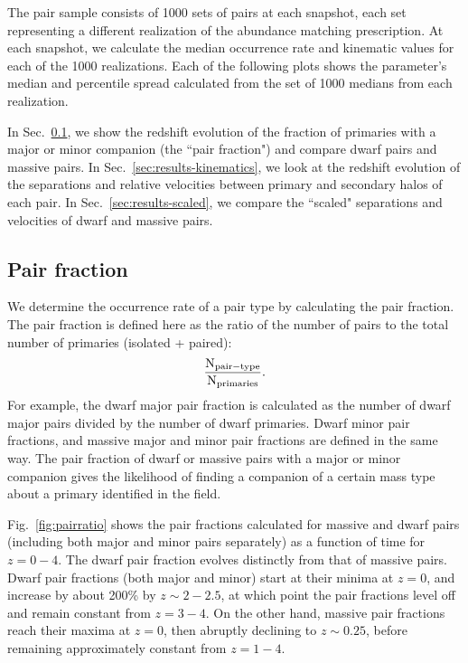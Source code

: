 \documentclass[twocolumn]{aastex631}
\begin{document}
The pair sample consists of 1000 sets of pairs at each snapshot, each set representing a different realization of the abundance matching prescription. 
At each snapshot, we calculate the median occurrence rate and kinematic values for each of the 1000 realizations. 
Each of the following plots shows the parameter's median and percentile spread calculated from the set of 1000 medians from each realization.

In Sec.~\ref{sec:results-frac}, we show the redshift evolution of the fraction of primaries with a major or minor companion (the ``pair fraction") and compare dwarf pairs and massive pairs.
In Sec.~\ref{sec:results-kinematics}, we look at the redshift evolution of the separations and relative velocities between primary and secondary halos of each pair. %
In Sec.~\ref{sec:results-scaled}, we compare the ``scaled" separations and velocities of dwarf and massive pairs.

        


    \subsection{Pair fraction}\label{sec:results-frac}
    We determine the occurrence rate of a pair type by calculating the pair fraction. 
    The pair fraction is defined here as the ratio of the number of pairs to the total number of primaries (isolated + paired):
    $$\rm \frac{N_{pair-type}}{N_{primaries}}.$$
    For example, the dwarf major pair fraction is calculated as the number of dwarf major pairs divided by the number of dwarf primaries. 
    Dwarf minor pair fractions, and massive major and minor pair fractions are defined in the same way. 
    The pair fraction of dwarf or massive pairs with a major or minor companion gives the likelihood of finding a companion of a certain mass type about a primary identified in the field.
    
    Fig.~\ref{fig:pairratio} shows the pair fractions calculated for massive and dwarf pairs (including both major and minor pairs separately) as a function of time for $z=0-4$. 
    The dwarf pair fraction evolves distinctly from that of massive pairs.
    Dwarf pair fractions (both major and minor) start at their minima at $z=0$, and increase by about 200\% by $z\sim2-2.5$, at which point the pair fractions level off and remain constant from $z=3-4$. 
    On the other hand, massive pair fractions reach their maxima at $z=0$, then abruptly declining to $z\sim0.25$, before remaining approximately constant from $z=1-4$. 
    
\end{document}
